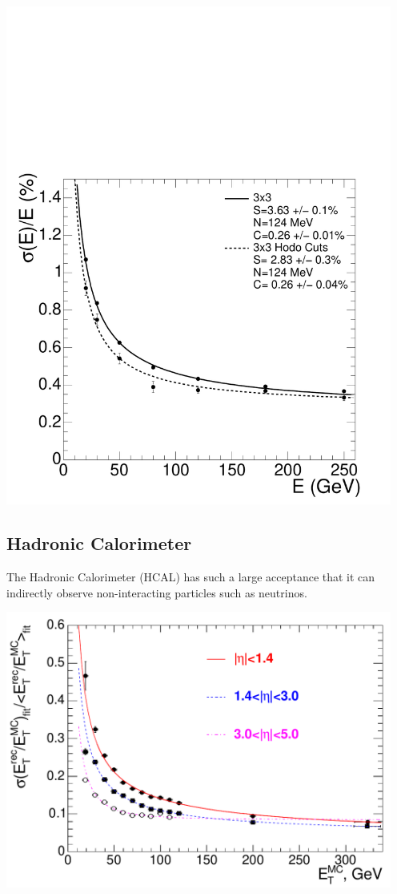 \centerline{
\includegraphics[width=5in]{Chapter3/importfigs/Figure_001-007.pdf}
}
 
\subsection{Hadronic Calorimeter}

The Hadronic Calorimeter (HCAL) has such a large acceptance that it can indirectly observe non-interacting particles such as neutrinos.

\centerline{
\includegraphics[width=5in]{Chapter3/importfigs/Figure_001-008.pdf}
}

